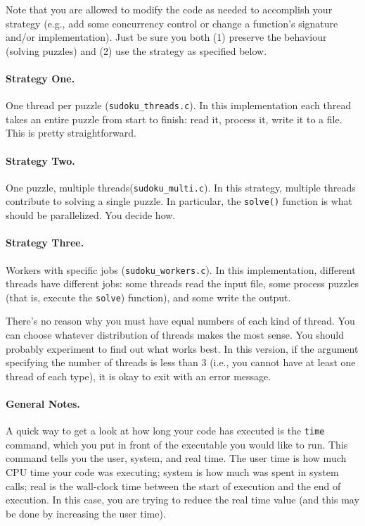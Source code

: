 \documentclass[letterpaper,10pt]{article}
\begin{document}
Note that you are allowed to 
modify the code as needed to accomplish your strategy (e.g., add some
concurrency control or change a function's signature and/or implementation).
Just be sure you both (1) preserve the behaviour (solving puzzles) and
(2) use the strategy as specified below.

\paragraph{Strategy One.}
One thread per puzzle (\texttt{sudoku\_threads.c}). In this implementation 
each thread takes an entire puzzle from start to finish: read it, process it, 
write it to a file. This is pretty straightforward.

\paragraph{Strategy Two.}

One puzzle, multiple threads(\texttt{sudoku\_multi.c}). In this strategy, 
multiple threads contribute to solving a single puzzle. In particular, 
the \texttt{solve()} function is what should be parallelized. You decide how.

\paragraph{Strategy Three.} Workers with specific jobs (\texttt{sudoku\_workers.c}). In this implementation, different threads 
have different jobs: some threads read the input file, some process puzzles
(that is, execute the \texttt{solve}) function), 
and some write the output.
	
There's no reason why you must have equal numbers of each kind of thread.
You can choose whatever distribution of threads makes the most sense. You
should probably experiment to find out what works best. In this version,
if the argument specifying the number of threads is less than 3 (i.e., you
cannot have at least one thread of each type), it is okay to exit with an
error message.

\paragraph{General Notes.}
A quick way to get a look at how long your code has executed is the 
\texttt{time} command, which you put in front of the executable you would
like to run. This command tells you the user, system, and real time. The
user time is how much CPU time your code was executing; system is how much
was spent in system calls; real is the wall-clock time between the start of
execution and the end of execution. In this case, you are trying to reduce
the real time value (and this may be done by increasing the user time).
\end{document}

